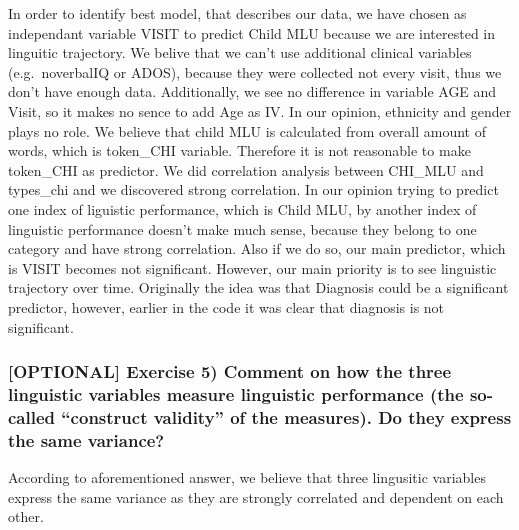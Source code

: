 \documentclass[]{article}
\begin{document}
In order to identify best model, that describes our data, we have chosen
as independant variable VISIT to predict Child MLU because we are
interested in linguitic trajectory. We belive that we can't use
additional clinical variables (e.g.~noverbalIQ or ADOS), because they
were collected not every visit, thus we don't have enough data.
Additionally, we see no difference in variable AGE and Visit, so it
makes no sence to add Age as IV. In our opinion, ethnicity and gender
plays no role. We believe that child MLU is calculated from overall
amount of words, which is token\_CHI variable. Therefore it is not
reasonable to make token\_CHI as predictor. We did correlation analysis
between CHI\_MLU and types\_chi and we discovered strong correlation. In
our opinion trying to predict one index of liguistic performance, which
is Child MLU, by another index of linguistic performance doesn't make
much sense, because they belong to one category and have strong
correlation. Also if we do so, our main predictor, which is VISIT
becomes not significant. However, our main priority is to see linguistic
trajectory over time. Originally the idea was that Diagnosis could be a
significant predictor, however, earlier in the code it was clear that
diagnosis is not significant.

\subsubsection{\texorpdfstring{{[}OPTIONAL{]} Exercise 5) Comment on how
the three linguistic variables measure linguistic performance (the
so-called ``construct validity'' of the measures). Do they express the
same
variance?}{{[}OPTIONAL{]} Exercise 5) Comment on how the three linguistic variables measure linguistic performance (the so-called construct validity of the measures). Do they express the same variance?}}\label{optional-exercise-5-comment-on-how-the-three-linguistic-variables-measure-linguistic-performance-the-so-called-construct-validity-of-the-measures.-do-they-express-the-same-variance}

According to aforementioned answer, we believe that three lingusitic
variables express the same variance as they are strongly correlated and
dependent on each other.
\end{document}
